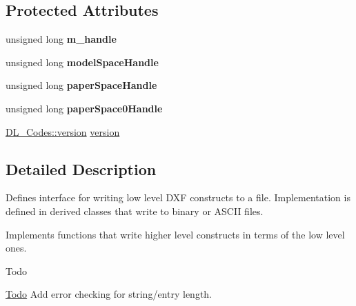 \subsection*{Protected Attributes}
\begin{DoxyCompactItemize}
\item 
\hypertarget{classDL__Writer_a00ca26dfb43df1d331499ca6502ef166}{unsigned long {\bfseries m\-\_\-handle}}\label{classDL__Writer_a00ca26dfb43df1d331499ca6502ef166}

\item 
\hypertarget{classDL__Writer_af308265738b91fec32cf9a8577f1eaef}{unsigned long {\bfseries model\-Space\-Handle}}\label{classDL__Writer_af308265738b91fec32cf9a8577f1eaef}

\item 
\hypertarget{classDL__Writer_a39bd1958bb1fbe183df800d5da61846d}{unsigned long {\bfseries paper\-Space\-Handle}}\label{classDL__Writer_a39bd1958bb1fbe183df800d5da61846d}

\item 
\hypertarget{classDL__Writer_a868d48a5c4dd4bbd37e9261e801ded6f}{unsigned long {\bfseries paper\-Space0\-Handle}}\label{classDL__Writer_a868d48a5c4dd4bbd37e9261e801ded6f}

\item 
\hyperlink{classDL__Codes_a5eba107e2d280c70b52ffab0292fb9dc}{D\-L\-\_\-\-Codes\-::version} \hyperlink{classDL__Writer_af82f15c96f8ddaa4ebfffdb5ea41fb8c}{version}
\end{DoxyCompactItemize}


\subsection{Detailed Description}
Defines interface for writing low level D\-X\-F constructs to a file. Implementation is defined in derived classes that write to binary or A\-S\-C\-I\-I files.

Implements functions that write higher level constructs in terms of the low level ones.

\begin{DoxyRefDesc}{Todo}
\item[\hyperlink{todo__todo000004}{Todo}]Add error checking for string/entry length. \end{DoxyRefDesc}


